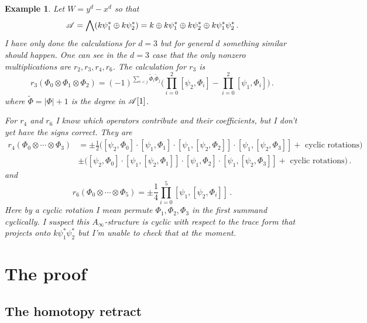\documentclass[english,letter paper,12pt,leqno]{article}
\theoremstyle{example}
\newtheorem{example}[theorem]{Example}
\numberwithin{equation}{section}
\begin{document}
\begin{example} Let $W = y^d - x^d$ so that
\[
\mathscr{A} = \bigwedge( k \psi_1^* \oplus k \psi_2^* ) = k \oplus k \psi_1^* \oplus k \psi_2^* \oplus k \psi_1^* \psi_2^*\,.
\]
I have only done the calculations for $d = 3$ but for general $d$ something similar should happen. One can see in the $d = 3$ case that the only nonzero multiplications are $r_2, r_3, r_4, r_6$. The calculation for $r_3$ is
\[
r_3( \Phi_0 \otimes \Phi_1 \otimes \Phi_2 ) = (-1)^{\sum_{i<j} \widetilde{\Phi}_i \widetilde{\Phi}_j}\Big( \prod_{i=0}^2 [\psi_2, \Phi_i] - \prod_{i=0}^2 [ \psi_1, \Phi_i ] \Big)\,.
\]
where $\widetilde{\Phi} = |\Phi| + 1$ is the degree in $\mathscr{A}[1]$.

For $r_4$ and $r_6$ I know which operators contribute and their coefficients, but I don't yet have the signs correct. They are
\begin{align*}
r_4( \Phi_0 \otimes \cdots \otimes \Phi_3 ) &= \pm \frac{1}{2}\Big( [ \psi_2, \Phi_0] \cdot [ \psi_1, \Phi_1 ] \cdot [ \psi_1, [ \psi_2, \Phi_2 ] ] \cdot [ \psi_1, [ \psi_2, \Phi_3 ]] + \text{ cyclic rotations} \Big)\\
& \pm \Big( [ \psi_2, \Phi_0 ] \cdot [ \psi_1, [ \psi_2, \Phi_1 ] ] \cdot [ \psi_1, \Phi_2 ] \cdot [ \psi_1, [ \psi_2, \Phi_3 ]] + \text{ cyclic rotations} \Big)\,.
\end{align*}
and
\[
r_6( \Phi_0 \otimes \cdots \otimes \Phi_5 ) = \pm \frac{1}{4} \prod_{i=0}^5 [ \psi_1, [\psi_2, \Phi_i ]]\,.
\]
Here by a cyclic rotation I mean permute $\Phi_1, \Phi_2, \Phi_3$ in the first summand cyclically. I suspect this $A_\infty$-structure is cyclic with respect to the trace form that projects onto $k \psi_1^* \psi_2^*$ but I'm unable to check that at the moment.
\end{example}

\section{The proof}

\subsection{The homotopy retract}
\end{document}
